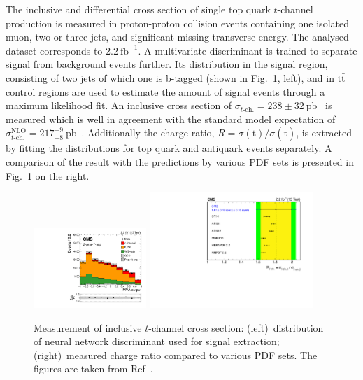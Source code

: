 \documentclass[12pt]{article}
\begin{document}
The inclusive and differential cross section of single top quark $t$-channel production is measured in proton-proton collision events containing one isolated muon, two or three jets, and significant missing transverse energy. The analysed dataset corresponds to $2.2~\mathrm{fb}^{-1}$. A multivariate discriminant is trained to separate signal from background events further. Its distribution in the signal region, consisting of two jets of which one is b-tagged (shown in Fig.~\ref{fig:t-channel}, left), and in $\mathrm{t}\bar{\mathrm{t}}$ control regions are used to estimate the amount of signal events through a maximum likelihood fit. An inclusive cross section of $\sigma_{t\mathrm{\mbox{-}ch.}}=238\pm32~\mathrm{pb}$~\cite{tchannel-inc} is measured which is well in agreement with the standard model expectation of $\sigma_{t\mathrm{\mbox{-}ch.}}^\mathrm{NLO}=217^{+9}_{-8}~\mathrm{pb}$~\cite{hathor}. Additionally the charge ratio, $R=\sigma(\mathrm{t})/\sigma(\bar{\mathrm{t}})$, is extracted by fitting the distributions for top quark and antiquark events separately. A comparison of the result with the predictions by various PDF sets is presented in Fig.~\ref{fig:t-channel} on the right.

\begin{figure}[!htb]
\begin{center}
\includegraphics[width=0.38\textwidth]{tch-nn.pdf}\hspace{0.02\textwidth}
\includegraphics[width=0.55\textwidth]{tch-ratio.pdf}
\caption{\label{fig:t-channel}Measurement of inclusive $t$-channel cross section: (left)~distribution of neural network discriminant used for signal extraction; (right)~measured charge ratio compared to various PDF sets. The figures are taken from Ref~\cite{tchannel-inc}.}
\end{center}
\end{figure}
\end{document}
